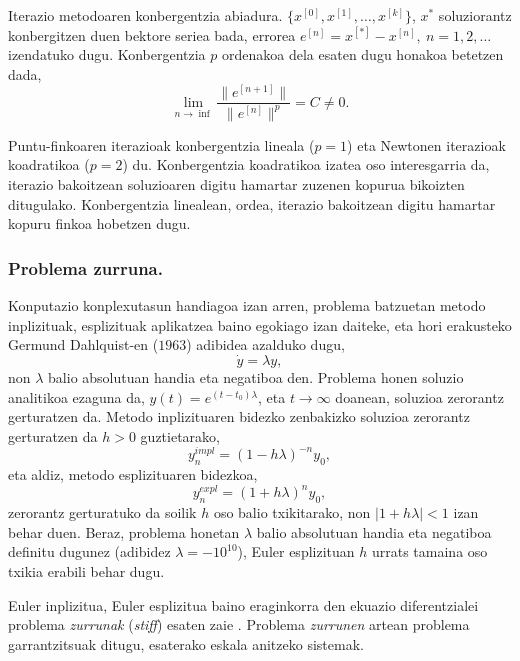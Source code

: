 Iterazio metodoaren konbergentzia abiadura. $\{x^{[0]},x^{[1]},\dots,x^{[k]}\}$, $x^{\ast}$ soluziorantz konbergitzen duen bektore seriea bada, errorea $e^{[n]}=x^{[*]}-x^{[n]}, \ n=1,2,\dots$ izendatuko dugu. Konbergentzia $p$ ordenakoa dela esaten dugu honakoa betetzen dada,
\begin{equation*}
\lim\limits_{n\rightarrow \inf} \frac{\|e^{[n+1]}\|}{\|e^{[n]}\|^p}= C \ne 0.
\end{equation*}

Puntu-finkoaren iterazioak konbergentzia lineala ($p=1$) eta Newtonen iterazioak koadratikoa ($p=2$) du. Konbergentzia koadratikoa izatea oso interesgarria da, iterazio bakoitzean soluzioaren digitu hamartar zuzenen kopurua bikoizten ditugulako. Konbergentzia linealean, ordea, iterazio bakoitzean digitu hamartar kopuru finkoa hobetzen dugu. 
  
\subsubsection*{Problema zurruna.}

Konputazio konplexutasun handiagoa izan arren, problema batzuetan metodo inplizituak, esplizituak aplikatzea baino egokiago izan daiteke, eta hori erakusteko Germund Dahlquist-en ($1963$) adibidea azalduko dugu,
\begin{equation}
 \label{eq:202c}
\dot y=\lambda y,
\end{equation} 
non $\lambda$ balio absolutuan handia eta negatiboa den. Problema honen soluzio analitikoa ezaguna da, $y(t)=e^{(t-t_0)\lambda}$, eta $t \rightarrow \infty$ doanean, soluzioa zerorantz gerturatzen da. Metodo inplizituaren bidezko zenbakizko soluzioa zerorantz gerturatzen da $h>0$ guztietarako,
\begin{equation*}
y_n^{impl}=(1-h\lambda)^{-n} y_0,
\end{equation*}    
eta aldiz, metodo esplizituaren bidezkoa,
\begin{equation*}
y_n^{expl}=(1+h\lambda)^{n} y_0,
\end{equation*}    
zerorantz gerturatuko da soilik $h$ oso balio txikitarako, non $|1+h\lambda|<1$ izan behar duen. Beraz, problema honetan $\lambda$ balio absolutuan handia  eta negatiboa definitu dugunez (adibidez $\lambda=-10^{10}$), Euler esplizituan $h$ urrats tamaina oso txikia erabili behar dugu.    

Euler inplizitua, Euler esplizitua baino eraginkorra den ekuazio diferentzialei problema \emph{zurrunak} (\emph{stiff}) esaten zaie \cite{Hairer2006}. Problema \emph{zurrunen} artean problema garrantzitsuak ditugu, esaterako eskala anitzeko sistemak. 

